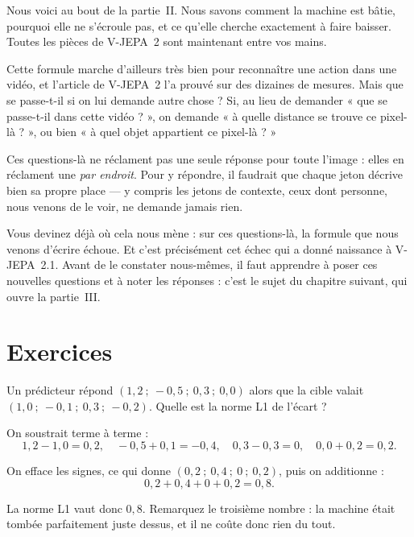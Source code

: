 \vspace{0.5em}

Nous voici au bout de la partie~II. Nous savons comment la machine est
bâtie, pourquoi elle ne s'écroule pas, et ce qu'elle cherche exactement à
faire baisser. Toutes les pièces de V-JEPA~2 sont maintenant entre vos
mains.

Cette formule marche d'ailleurs très bien pour reconnaître une action dans
une vidéo, et l'article de V-JEPA~2 l'a prouvé sur des dizaines de mesures.
Mais que se passe-t-il si on lui demande autre chose ? Si, au lieu de
demander « que se passe-t-il dans cette vidéo ? », on demande « à quelle
distance se trouve ce pixel-là ? », ou bien « à quel objet appartient ce
pixel-là ? »

Ces questions-là ne réclament pas une seule réponse pour toute l'image :
elles en réclament une \emph{par endroit}. Pour y répondre, il faudrait que
chaque jeton décrive bien sa propre place — y compris les jetons de
contexte, ceux dont personne, nous venons de le voir, ne demande jamais
rien.

Vous devinez déjà où cela nous mène : sur ces questions-là, la formule que
nous venons d'écrire échoue. Et c'est précisément cet échec qui a donné
naissance à V-JEPA~2.1. Avant de le constater nous-mêmes, il faut apprendre
à poser ces nouvelles questions et à noter les réponses : c'est le sujet du
chapitre suivant, qui ouvre la partie~III.

\section*{Exercices}

\begin{exercice}
Un prédicteur répond $(1{,}2 \ ; \ -0{,}5 \ ; \ 0{,}3 \ ; \ 0{,}0)$ alors
que la cible valait $(1{,}0 \ ; \ -0{,}1 \ ; \ 0{,}3 \ ; \ -0{,}2)$. Quelle
est la norme L1 de l'écart ?
\end{exercice}

\begin{solution}
On soustrait terme à terme :
\[
  1{,}2 - 1{,}0 = 0{,}2 , \quad
  -0{,}5 + 0{,}1 = -0{,}4 , \quad
  0{,}3 - 0{,}3 = 0 , \quad
  0{,}0 + 0{,}2 = 0{,}2 .
\]

On efface les signes, ce qui donne $(0{,}2 \ ; \ 0{,}4 \ ; \ 0 \ ; \
0{,}2)$, puis on additionne :
\[
  0{,}2 + 0{,}4 + 0 + 0{,}2 = 0{,}8 .
\]

La norme L1 vaut donc $0{,}8$. Remarquez le troisième nombre : la machine
était tombée parfaitement juste dessus, et il ne coûte donc rien du tout.
\end{solution}

